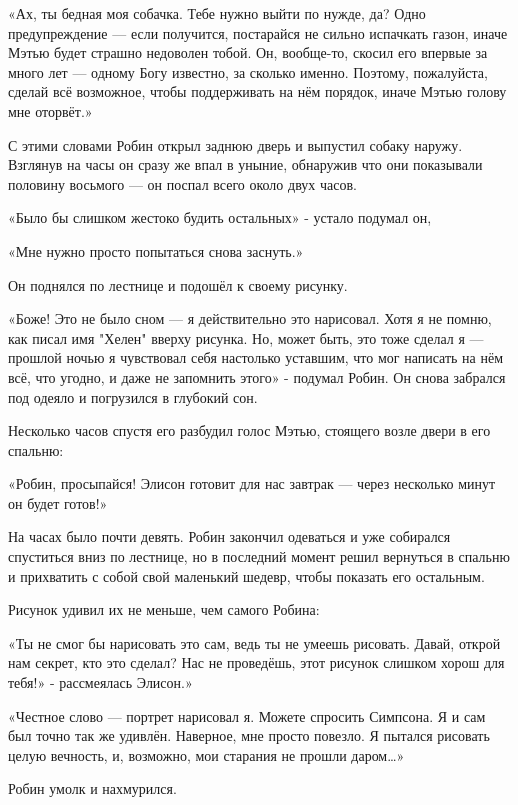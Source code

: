 \documentclass[a4paper,12pt]{book}
\begin{document}
\par
«Ах, ты бедная моя собачка. Тебе нужно выйти по нужде, да? Одно предупреждение — если получится, постарайся не сильно испачкать газон, иначе Мэтью будет страшно недоволен тобой. Он, вообще-то, скосил его впервые за много лет — одному Богу известно, за сколько именно. Поэтому, пожалуйста, сделай всё возможное, чтобы поддерживать на нём порядок, иначе Мэтью голову мне оторвёт.»
\par
С этими словами Робин открыл заднюю дверь и выпустил собаку наружу. Взглянув на часы он сразу же впал в уныние, обнаружив что они показывали половину восьмого — он поспал всего около двух часов.
\par
«Было бы слишком жестоко будить остальных» - устало подумал он,
\par
«Мне нужно просто попытаться снова заснуть.»
\par
Он поднялся по лестнице и подошёл к своему рисунку.
\par
«Боже! Это не было сном — я действительно это нарисовал. Хотя я не помню, как писал имя "Хелен" вверху рисунка. Но, может быть, это тоже сделал я — прошлой ночью я чувствовал себя настолько уставшим, что мог написать на нём всё, что угодно, и даже не запомнить этого» - подумал Робин. Он снова забрался под одеяло и погрузился в глубокий сон.\\
\par
Несколько часов спустя его разбудил голос Мэтью, стоящего возле двери в его спальню:
\par
«Робин, просыпайся! Элисон готовит для нас завтрак — через несколько минут он будет готов!»
\par
На часах было почти девять. Робин закончил одеваться и уже собирался спуститься вниз по лестнице, но в последний момент решил вернуться в спальню и прихватить с собой свой маленький шедевр, чтобы показать его остальным.
\par
Рисунок удивил их не меньше, чем самого Робина:
\par
«Ты не смог бы нарисовать это сам, ведь ты не умеешь рисовать. Давай, открой нам секрет, кто это сделал? Нас не проведёшь, этот рисунок слишком хорош для тебя!» - рассмеялась Элисон.»
\par
«Честное слово — портрет нарисовал я. Можете спросить Симпсона. Я и сам был точно так же удивлён. Наверное, мне просто повезло. Я пытался рисовать целую вечность, и, возможно, мои старания не прошли даром…»
\par
Робин умолк и нахмурился.
\par
\end{document}
